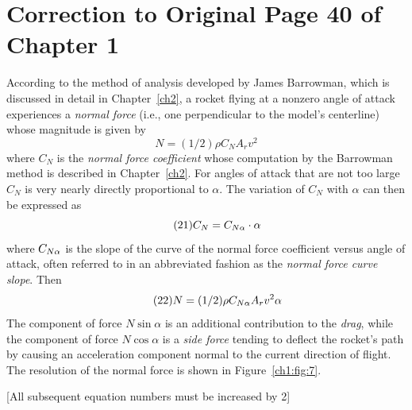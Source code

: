 \chapter{Correction to Original Page 40 of Chapter 1}\label{supp:ch1-page40}

According to the method of analysis developed by James Barrowman, which is discussed in detail in
Chapter~\ref{ch2}, a rocket flying at a nonzero angle of attack experiences a \emph{normal force} (i.e., one
perpendicular to the model's centerline) whose magnitude is given by
\begin{equation*}\tag{20}
N = (1/2)\rho C_N A_r v^{2}
\end{equation*}
where $C_N$ is the \emph{normal force coefficient} whose computation by the Barrowman method is described in
Chapter~\ref{ch2}. For angles of attack that are not too large $C_N$ is very nearly directly proportional to
$\alpha$. The variation of $C_N$ with $\alpha$ can then be expressed as
\begin{equation*}\tag{21}
C_N = C_{N\alpha} \cdot \alpha
\end{equation*}
where $C_{N\alpha}$ is the slope of the curve of the normal force coefficient versus angle of attack, often referred
to in an abbreviated fashion as the \emph{normal force curve slope}. Then
\begin{equation*}\tag{22}
N = (1/2)\rho C_{N\alpha} A_r v^{2}\alpha
\end{equation*}
The component of force $N\sin\alpha$ is an additional contribution to the \emph{drag}, while the component of
force $N\cos\alpha$ is a \emph{side force} tending to deflect the rocket's path by causing an acceleration
component normal to the current direction of flight. The resolution of the normal force is shown in
Figure~\ref{ch1:fig:7}.

\bigskip
\begin{center}
[All subsequent equation numbers must be increased by 2]
\end{center}
